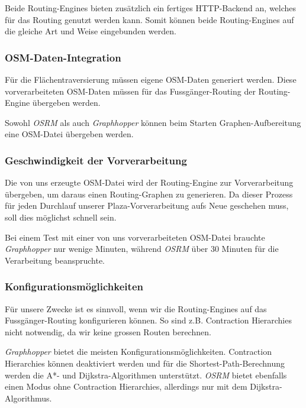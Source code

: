 Beide Routing-Engines bieten zusätzlich ein fertiges HTTP-Backend an, welches für das Routing genutzt werden kann. Somit können beide Routing-Engines auf die gleiche Art und Weise eingebunden werden.


\subsubsection{OSM-Daten-Integration}
\label{analyse:OSM-Daten-Integration}
Für die Flächentraversierung müssen eigene \ac{OSM}-Daten generiert werden. Diese vorverarbeiteten \ac{OSM}-Daten müssen für das Fussgänger-Routing der Routing-Engine übergeben werden.

Sowohl \emph{OSRM} als auch \emph{Graphhopper} können beim Starten Graphen-Aufbereitung eine \ac{OSM}-Datei übergeben werden.


\subsubsection{Geschwindigkeit der Vorverarbeitung}
\label{analyse:Geschwindigkeit der Vorverarbeitung}
Die von uns erzeugte OSM-Datei wird der Routing-Engine zur Vorverarbeitung übergeben, um daraus einen Routing-Graphen zu generieren. Da dieser Prozess für jeden Durchlauf unserer Plaza-Vorverarbeitung aufs Neue geschehen muss, soll dies möglichst schnell sein.

Bei einem Test mit einer von uns vorverarbeiteten OSM-Datei brauchte \emph{Graphhopper} nur wenige Minuten, während \emph{OSRM} über 30 Minuten für die Verarbeitung beanspruchte.

\subsubsection{Konfigurationsmöglichkeiten}
\label{analyse:Konfigurationsmöglichkeiten}
Für unsere Zwecke ist es sinnvoll, wenn wir die Routing-Engines auf das Fussgänger-Routing konfigurieren können. So sind z.B. Contraction Hierarchies nicht notwendig, da wir keine grossen Routen berechnen.

\emph{Graphhopper} bietet die meisten Konfigurationsmöglichkeiten. Contraction Hierarchies können deaktiviert werden und für die Shortest-Path-Berechnung werden die A*- und Dijkstra-Algorithmen unterstützt. \emph{OSRM} bietet ebenfalls einen Modus ohne Contraction Hierarchies, allerdings nur mit dem Dijkstra-Algorithmus.

